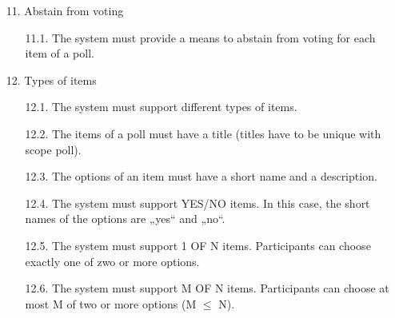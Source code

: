 \begin{enumerate}
\item[11.] Abstain from voting

	\begin{enumerate}
	\item[11.1.] The system must provide a means to abstain from voting for each item of a poll. %
	
	
	
	\end{enumerate}



\item[12.] Types of items

	\begin{enumerate}
	\item[12.1.] The system must support different types of items. %
	
	
	\item[12.2.] The items of a poll must have a title (titles have to be unique with scope poll). %
	
	
	\item[12.3.] The options of an item must have a short name and a description. %
	
	
	\item[12.4.] The system must support YES/NO items. In this case, the short names of the options are
	„yes“ and „no“. %
	
	
	\item[12.5.] The system must support 1 OF N items. Participants can choose exactly one of zwo or
	more options. %
	
	
	\item[12.6.] The system must support M OF N items. Participants can choose at most M of two or
	more options (M $\leq$ N). %
	
	
	
	
	\end{enumerate}





\end{enumerate}
